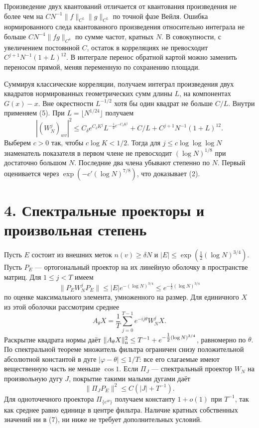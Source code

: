 \documentclass[11pt,a4paper]{article}
\newcommand{\sect}[1]{\section*{\sffamily\color{ink}#1}}
\begin{document}
Произведение двух квантований отличается от квантования произведения не более чем на $C N^{-1}\|f\|_{C^5}\|g\|_{C^5}$ по точной фазе Вейля. Ошибка нормированного следа квантованного произведения относительно интеграла не больше $C N^{-4}\|fg\|_{C^4}$ по сумме частот, кратных $N$. В совокупности, с увеличением постоянной $C$, остаток в корреляциях не превосходит $C^{j+1}N^{-1}(1+L)^{12}$. В интеграле перенос обратной картой можно заменить переносом прямой, меняя переменную по сохранению площади.

Суммируя классические корреляции, получаем интеграл произведения двух квадратов нормированных геометрических сумм длины $L$, на компонентах $G(x)-x$. Вне окрестности $L^{-1/2}$ хотя бы один квадрат не больше $C/L$. Внутри применяем (5). При $L=\lfloor N^{1/24}\rfloor$ получаем
\[
 |(W_N^j)_{wv}|^2
 \le C_\delta e^{C_\delta K^j}
                L^{-\tfrac12e^{-C_\delta K^j}}+
                 C/L + C^{j+1} N^{-1}(1+L)^{12}.                   \tag{6}
\]
Выберем $c>0$ так, чтобы $c\log K<1/2$. Тогда для $j\le c\log\log\log N$ знаменатель показателя в первом члене не превосходит $(\log N)^{1/8}$ при достаточно большом $N$. Последние два члена убывают степенно по $N$. Первый оценивается через $\exp(-c'(\log N)^{7/8})$, что доказывает (2).
\newpage
\sect{4. Спектральные проекторы и произвольная степень}
Пусть $E$ состоит из внешних меток $n(v)\ge\delta N$ и
$|E|\le\exp(\tfrac12(\log N)^{3/4})$. Пусть $P_E$ --- ортогональный проектор на их линейную оболочку в пространстве матриц. Для $1\le j<T$ имеем
\[
        \|P_E W_N^j P_E\|
           \le |E| e^{-(\log N)^{3/4}}
           \le e^{-\tfrac12(\log N)^{3/4}}
\]
по оценке максимального элемента, умноженного на размер. Для единичного $X$ из этой оболочки рассмотрим среднее
\[
         A_\theta X=\frac1T\sum_{j=0}^{T-1} e^{-ij\theta}W_N^jX .
\]
Раскрытие квадрата нормы даёт $\|A_\theta X\|_{\rm n}^2\le T^{-1}+e^{-\tfrac12(\log N)^{3/4}}$, равномерно по $\theta$. По спектральной теореме множитель фильтра ограничен снизу положительной абсолютной константой в дуге $|\varphi-\theta|\le1/T$: все его слагаемые имеют вещественную часть не меньше $\cos 1$. Если $\Pi_J$ --- спектральный проектор $W_N$ на произвольную дугу $J$, покрытие такими малыми дугами даёт
\[
                         \|\Pi_J P_E\|^2\le C(|J|+T^{-1}).           \tag{7}
\]
Для одноточечного проектора $\Pi_{\{e^{i\theta}\}}$ получаем константу $1+o(1)$ при $T^{-1}$, так как среднее равно единице в центре фильтра. Наличие кратных собственных значений ни в (7), ни ниже не требует дополнительных условий.
\end{document}
